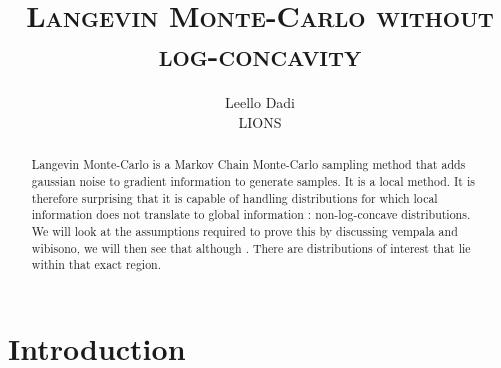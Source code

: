 \documentclass[11pt,twoside]{article}
\title{\textsc{Langevin Monte-Carlo without log-concavity}}
\author{Leello Dadi \\ LIONS}
\date{}
\begin{document}
\maketitle

\begin{abstract}
    Langevin Monte-Carlo is a Markov Chain Monte-Carlo sampling method that adds gaussian noise to gradient information to generate samples. It is a local method. It is therefore surprising that it is capable of handling distributions for which local information does not translate to global information : non-log-concave distributions. We will look at the assumptions required to prove this by discussing vempala and wibisono, we will then see that although . There are distributions of interest that lie within that exact region.
\end{abstract}

\section{Introduction}
\end{document}

